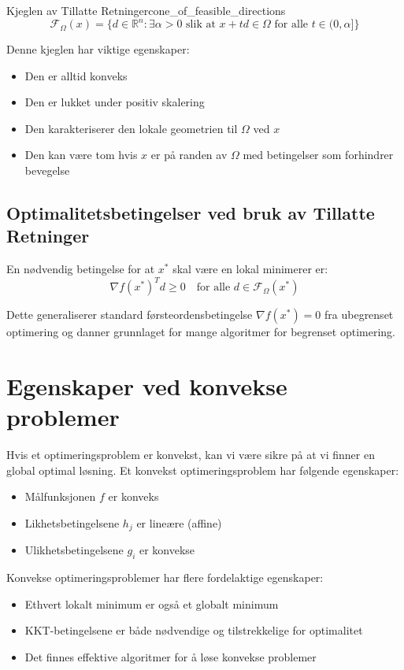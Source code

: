 \begin{definition}{Kjeglen av Tillatte Retninger}{cone_of_feasible_directions}
	\[
		\mathcal{F}_\Omega(x) = \{d \in \mathbb{R}^n : \exists \alpha > 0 \text{ slik at } x + td \in \Omega \text{ for alle } t \in (0, \alpha] \}
	\]
\end{definition}

Denne kjeglen har viktige egenskaper:
\begin{itemize}
	\item Den er alltid konveks
	\item Den er lukket under positiv skalering
	\item Den karakteriserer den lokale geometrien til \(\Omega\) ved \(x\)
	\item Den kan være tom hvis \(x\) er på randen av \(\Omega\) med betingelser som forhindrer bevegelse
\end{itemize}

\subsection{Optimalitetsbetingelser ved bruk av Tillatte Retninger}
En nødvendig betingelse for at \(x^*\) skal være en lokal minimerer er:
\begin{equation}
	\nabla f(x^*)^T d \geq 0 \quad \text{for alle } d \in \mathcal{F}_\Omega(x^*)
\end{equation}

Dette generaliserer standard førsteordensbetingelse \(\nabla f(x^*) = 0\) fra ubegrenset optimering og danner grunnlaget for mange algoritmer for begrenset optimering.

\section{Egenskaper ved konvekse problemer}

Hvis et optimeringsproblem er konvekst, kan vi være sikre på at vi finner en global optimal løsning. Et konvekst optimeringsproblem har følgende egenskaper:
\begin{itemize}
	\item Målfunksjonen \( f \) er konveks
	\item Likhetsbetingelsene \( h_j \) er lineære (affine)
	\item Ulikhetsbetingelsene \( g_i \) er konvekse
\end{itemize}

Konvekse optimeringsproblemer har flere fordelaktige egenskaper:
\begin{itemize}
	\item Ethvert lokalt minimum er også et globalt minimum
	\item KKT-betingelsene er både nødvendige og tilstrekkelige for optimalitet
	\item Det finnes effektive algoritmer for å løse konvekse problemer
\end{itemize}

